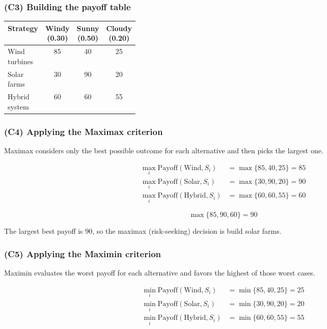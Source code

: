 \subsubsection{(C3) Building the payoff table}\label{subsubsec:practice-activity-1-solution-2-c3}

\begin{center}
	\begin{tabularx}{\linewidth}{@{}L{0.3\linewidth}C C C@{}}
		\toprule
		Strategy & Windy (0.30) & Sunny (0.50) & Cloudy (0.20) \\
		\midrule
		Wind turbines & 85 & 40 & 25 \\
		Solar farms & 30 & 90 & 20 \\
		Hybrid system & 60 & 60 & 55 \\
		\bottomrule
	\end{tabularx}
\end{center}

\subsubsection{(C4) Applying the Maximax criterion}\label{subsubsec:practice-activity-1-solution-2-c4}

Maximax considers only the best possible outcome for each alternative and then picks the largest one.

\[
\begin{aligned}
\max_i \text{Payoff}(\text{Wind}, S_i) &= \max\{85, 40, 25\} = 85\\
\max_i \text{Payoff}(\text{Solar}, S_i) &= \max\{30, 90, 20\} = 90\\
\max_i \text{Payoff}(\text{Hybrid}, S_i) &= \max\{60, 60, 55\} = 60
\end{aligned}
\]

\[
\max\{85, 90, 60\} = 90
\]

The largest best payoff is 90, so the maximax (risk-seeking) decision is build solar farms.

\subsubsection{(C5) Applying the Maximin criterion}\label{subsubsec:practice-activity-1-solution-2-c5}

Maximin evaluates the worst payoff for each alternative and favors the highest of those worst cases.

\[
\begin{aligned}
\min_i \text{Payoff}(\text{Wind}, S_i) &= \min\{85, 40, 25\} = 25\\
\min_i \text{Payoff}(\text{Solar}, S_i) &= \min\{30, 90, 20\} = 20\\
\min_i \text{Payoff}(\text{Hybrid}, S_i) &= \min\{60, 60, 55\} = 55
\end{aligned}
\]

